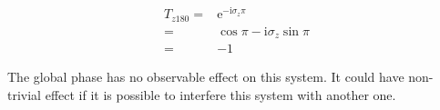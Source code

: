 \documentclass[10pt,fleqn]{article}
\newcommand{\ue}{\mathrm{e}}
\newcommand{\ui}{\mathrm{i}}
\newcommand{\eqar}[1]
{
  \begin{align*}
    #1
  \end{align*}
}
\begin{document}
\subsection{}
\eqar{
  T_{z180}=&\ue^{-\ui\sigma_z\pi}\\
  =&\cos\pi-\ui\sigma_z\sin\pi\\
  =&-1
}
The global phase has no observable effect on this system.
It could have non-trivial effect if it is possible to interfere this system
with another one.
\section{}
\subsection{}
\subsection{}
\subsection{}
\end{document}
